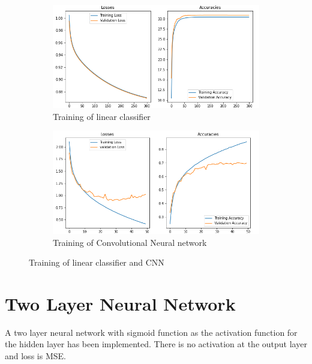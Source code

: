 \documentclass[a4paper, 12pt]{article}
\begin{document}
			\begin{figure}[h]
				\begin{subfigure}{0.45\linewidth}
					\centering
					\includegraphics[scale = 0.35]{../images/linear_model}
					\caption{Training of linear classifier}
					\label{fig:ling}
				\end{subfigure}
				\hfill
				\begin{subfigure}{0.45\linewidth}
					\centering
					\includegraphics[scale = 0.35]{../images/cnn_model}
					\caption{Training of Convolutional Neural network}
					\label{fig:cnn}
				\end{subfigure}
			\caption{Training of linear classifier and CNN}
			\end{figure}
	\section{Two Layer Neural Network}
		A two layer neural network with sigmoid function as the activation function for the hidden layer has been implemented. There is no activation at the output layer and loss is MSE. 
\end{document}
